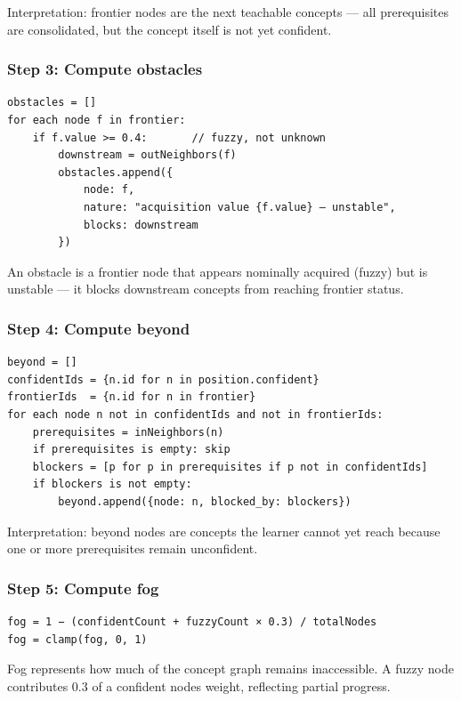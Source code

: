 \documentclass[
]{article}
\begin{document}
Interpretation: frontier nodes are the next teachable concepts --- all prerequisites are consolidated, but the concept itself is not yet confident.

\subsubsection{Step 3: Compute obstacles}\label{step-3-compute-obstacles}

\begin{verbatim}
obstacles = []
for each node f in frontier:
    if f.value >= 0.4:       // fuzzy, not unknown
        downstream = outNeighbors(f)
        obstacles.append({
            node: f,
            nature: "acquisition value {f.value} — unstable",
            blocks: downstream
        })
\end{verbatim}

An obstacle is a frontier node that appears nominally acquired (fuzzy) but is unstable --- it blocks downstream concepts from reaching frontier status.

\subsubsection{Step 4: Compute beyond}\label{step-4-compute-beyond}

\begin{verbatim}
beyond = []
confidentIds = {n.id for n in position.confident}
frontierIds  = {n.id for n in frontier}
for each node n not in confidentIds and not in frontierIds:
    prerequisites = inNeighbors(n)
    if prerequisites is empty: skip
    blockers = [p for p in prerequisites if p not in confidentIds]
    if blockers is not empty:
        beyond.append({node: n, blocked_by: blockers})
\end{verbatim}

Interpretation: beyond nodes are concepts the learner cannot yet reach because one or more prerequisites remain unconfident.

\subsubsection{Step 5: Compute fog}\label{step-5-compute-fog}

\begin{verbatim}
fog = 1 − (confidentCount + fuzzyCount × 0.3) / totalNodes
fog = clamp(fog, 0, 1)
\end{verbatim}

Fog represents how much of the concept graph remains inaccessible. A fuzzy node contributes 0.3 of a confident node\textquotesingle s weight, reflecting partial progress.
\end{document}

